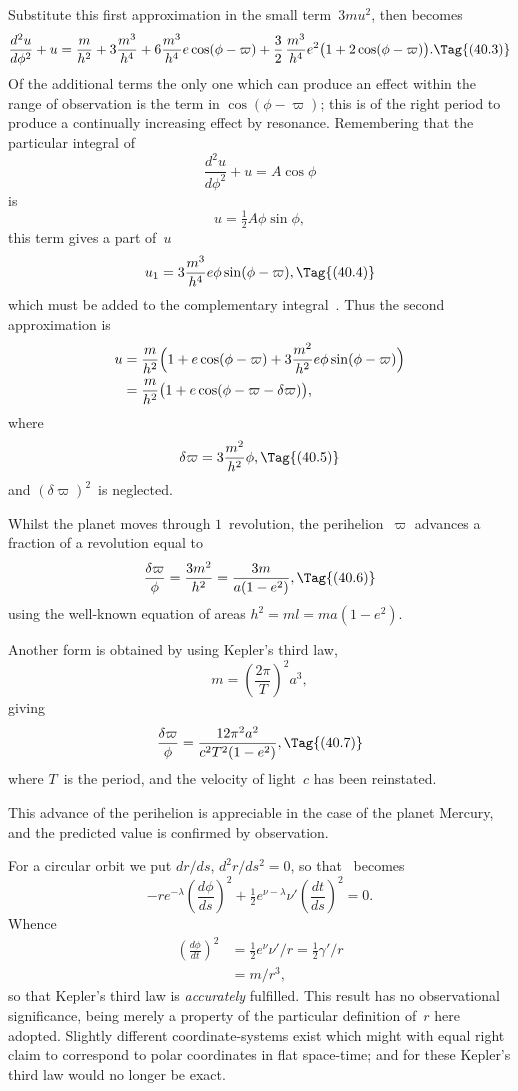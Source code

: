 \documentclass[12pt]{book}
\begin{document}
Substitute this first approximation in the small term~$3mu^2$, then 
becomes
\[
\frac{d^{2}u}{d\phi^{2}} + u = \frac{m}{h^{2}} + 3\frac{m^{3}}{h^{4}}
+ 6\frac{m^{3}}{h^{4}} e\cos(\phi - \varpi)
+ \frac{3}{2}\, \frac{m^{3}}{h^{4}} e^{2} \bigl(1 + 2\cos(\phi - \varpi)\bigr).
\Tag{(40.3)}
\]
Of the additional terms the only one which can produce an effect within the
range of observation is the term in $\cos(\phi - \varpi)$; this is of the right period to
produce a continually increasing effect by resonance. Remembering that the
particular integral of
\[
\frac{d^{2} u}{d\phi^{2}} + u = A\cos\phi
\]
is
\[
u = \tfrac{1}{2}A \phi \sin\phi,
\]
this term gives a part of~$u$
\[
u_{1} = 3\frac{m^{3}}{h^{4}} e\phi \sin(\phi - \varpi),
\Tag{(40.4)}
\]
which must be added to the complementary integral~. Thus the second
approximation is
\begin{align*}
  u &= \frac{m}{h^{2}} \Bigl(1 + e\cos(\phi - \varpi) + 3 \frac{m^{2}}{h^{2}} e\phi \sin(\phi - \varpi)\Bigr) \\
  &= \frac{m}{h^{2}} \bigl(1 + e\cos(\phi - \varpi - \delta\varpi)\bigr),
\end{align*}
where
\[
\delta\varpi = 3\frac{m^{2}}{h^{2}} \phi,
\Tag{(40.5)}
\]
and $(\delta\varpi)^{2}$~is neglected.

Whilst the planet moves through $1$~revolution, the perihelion~$\varpi$ advances
a fraction of a revolution equal to
\[
\frac{\delta\varpi}{\phi} = \frac{3m^{2}}{h^{2}} = \frac{3m}{a(1 - e^{2})},
\Tag{(40.6)}
\]
using the well-known equation of areas $h^{2} = ml = ma(1 - e^{2})$.%

Another form is obtained by using Kepler's third law,
%
\[
m = \left(\frac{2\pi}{T}\right)^{2} a^{3},
\]
giving
\[
\frac{\delta\varpi}{\phi} = \frac{12\pi^{2} a^2}{c^2 T^{2}(1 - e^{2})},
\Tag{(40.7)}
\]
where $T$~is the period, and the velocity of light~$c$ has been reinstated.

This advance of the perihelion is appreciable in the case of the planet
Mercury, and the predicted value is confirmed by observation.

For a circular orbit we put $dr/ds$, $d^{2}r/ds^{2} = 0$, so that ~becomes
\[
-re^{-\lambda} \left(\frac{d\phi}{ds}\right)^{2} + \tfrac{1}{2} e^{\nu-\lambda} \nu' \left(\frac{dt}{ds}\right)^{2} = 0.
\]
Whence
\begin{align*}
  \left(\frac{d\phi}{dt}\right)^{2}
  &= \tfrac{1}{2} e^{\nu} \nu'/r = \tfrac{1}{2} \gamma'/r \\
  &= m/r^{3},
\end{align*}
so that Kepler's third law is \emph{accurately} fulfilled. This result has no observational
significance, being merely a property of the particular definition of~$r$
here adopted. Slightly different coordinate\hyp{}systems exist which might with
equal right claim to correspond to polar coordinates in flat space-time; and
for these Kepler's third law would no longer be exact.
\end{document}
